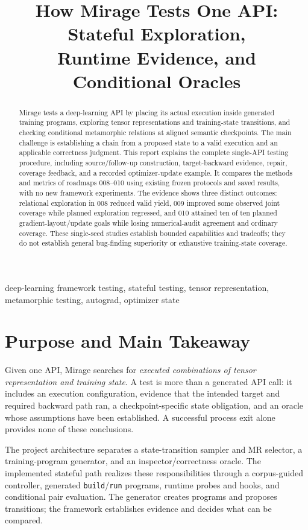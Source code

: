 \documentclass[conference]{IEEEtran}
\title{How Mirage Tests One API: Stateful Exploration,\\Runtime Evidence, and Conditional Oracles}
\author{\IEEEauthorblockN{Mirage Project}\IEEEauthorblockA{Technical report on roadmaps 008--010\\Repository evidence review, November 15, 2026}}
\begin{document}
\maketitle
\begin{abstract}
Mirage tests a deep-learning API by placing its actual execution inside generated training programs, exploring tensor representations and training-state transitions, and checking conditional metamorphic relations at aligned semantic checkpoints. The main challenge is establishing a chain from a proposed state to a valid execution and an applicable correctness judgment. This report explains the complete single-API testing procedure, including source/follow-up construction, target-backward evidence, repair, coverage feedback, and a recorded optimizer-update example. It compares the methods and metrics of roadmaps 008--010 using existing frozen protocols and saved results, with no new framework experiments. The evidence shows three distinct outcomes: relational exploration in 008 reduced valid yield, 009 improved some observed joint coverage while planned exploration regressed, and 010 attained ten of ten planned gradient-layout/update goals while losing numerical-audit agreement and ordinary coverage. These single-seed studies establish bounded capabilities and tradeoffs; they do not establish general bug-finding superiority or exhaustive training-state coverage.
\end{abstract}
\begin{IEEEkeywords}
deep-learning framework testing, stateful testing, tensor representation, metamorphic testing, autograd, optimizer state
\end{IEEEkeywords}

\section{Purpose and Main Takeaway}
Given one API, Mirage searches for \emph{executed combinations of tensor representation and training state}. A test is more than a generated API call: it includes an execution configuration, evidence that the intended target and required backward path ran, a checkpoint-specific state obligation, and an oracle whose assumptions have been established. A successful process exit alone provides none of these conclusions.

The project architecture separates a state-transition sampler and MR selector, a training-program generator, and an inspector/correctness oracle. The implemented stateful path realizes these responsibilities through a corpus-guided controller, generated \texttt{build}/\texttt{run} programs, runtime probes and hooks, and conditional pair evaluation. The generator creates programs and proposes transitions; the framework establishes evidence and decides what can be compared.
\end{document}
